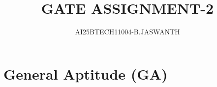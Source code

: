 \documentclass[journal]{IEEEtran}
\begin{document}

\vspace{3cm}


\renewcommand{\thetable}{\theenumi}




\vspace{3cm}


\title{GATE ASSIGNMENT-2}
\author{AI25BTECH11004-B.JASWANTH}
{\let\newpage\relax\maketitle}


\renewcommand{\thefigure}{\theenumi}
\renewcommand{\thetable}{\theenumi}
\setlength{\intextsep}{10pt} %

\section*{General Aptitude (GA)}
\end{document}
